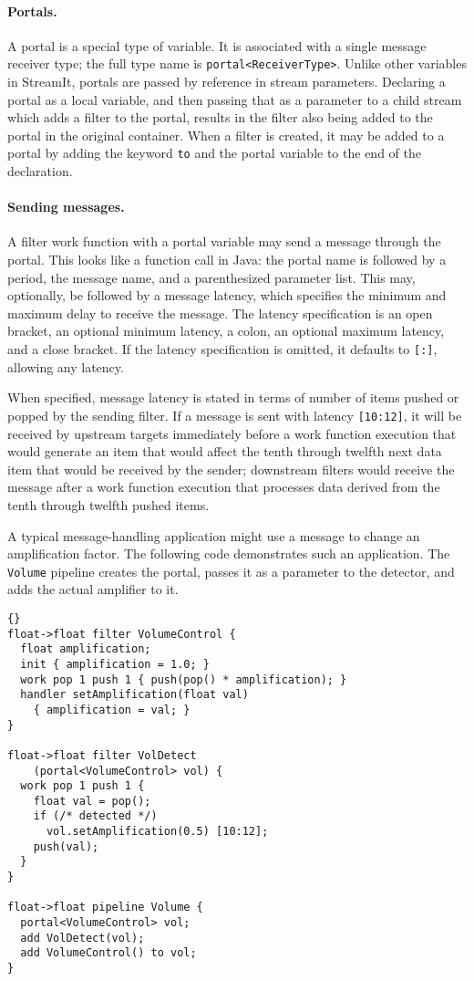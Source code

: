 \documentclass[11pt]{article}
\begin{document}
\paragraph{Portals.}  A portal is a special type of variable.  It is
associated with a single message receiver type; the full type name is
\lstinline|portal<ReceiverType>|.  Unlike other variables in StreamIt,
portals are passed by reference in stream parameters.  Declaring a
portal as a local variable, and then passing that as a parameter to a
child stream which adds a filter to the portal, results in the filter
also being added to the portal in the original container.
When a filter is created, it may be added to a portal by adding the
keyword \lstinline|to| and the portal variable to the end of the
declaration.

\paragraph{Sending messages.}  A filter work function with a portal
variable may send a message through the portal.  This looks like a
function call in Java: the portal name is followed by a period, the
message name, and a parenthesized parameter list.  This may,
optionally, be followed by a message latency, which specifies the
minimum and maximum delay to receive the message.  The latency
specification is an open bracket, an optional minimum latency, a
colon, an optional maximum latency, and a close bracket.  If the
latency specification is omitted, it defaults to \lstinline|[:]|,
allowing any latency.

When specified, message latency is stated in terms of number of items
pushed or popped by the sending filter.  If a message is sent with
latency \lstinline|[10:12]|, it will be received by upstream targets
immediately before a work function execution that would generate an
item that would affect the tenth through twelfth next data item that
would be received by the sender; downstream filters would receive the
message after a work function execution that processes data derived
from the tenth through twelfth pushed items.

A typical message-handling application might use a message to change
an amplification factor.  The following code demonstrates such an
application.  The \lstinline|Volume| pipeline creates the portal,
passes it as a parameter to the detector, and adds the actual
amplifier to it.

\begin{lstlisting}{}
float->float filter VolumeControl {
  float amplification;
  init { amplification = 1.0; }
  work pop 1 push 1 { push(pop() * amplification); }
  handler setAmplification(float val)
    { amplification = val; }
}

float->float filter VolDetect
    (portal<VolumeControl> vol) {
  work pop 1 push 1 {
    float val = pop();
    if (/* detected */)
      vol.setAmplification(0.5) [10:12];
    push(val);
  }
}

float->float pipeline Volume {
  portal<VolumeControl> vol;
  add VolDetect(vol);
  add VolumeControl() to vol;
}
\end{lstlisting}
\end{document}
